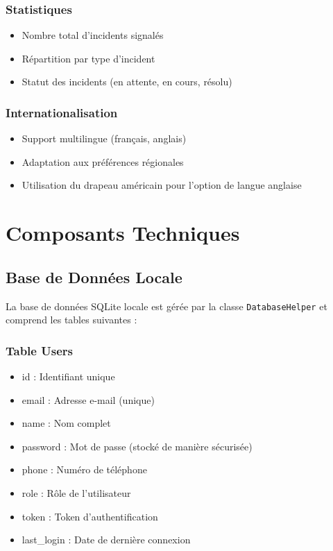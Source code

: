 \documentclass[12pt,a4paper]{article}
\begin{document}
\subsubsection{Statistiques}
\begin{itemize}
    \item Nombre total d'incidents signalés
    \item Répartition par type d'incident
    \item Statut des incidents (en attente, en cours, résolu)
\end{itemize}

\subsubsection{Internationalisation}
\begin{itemize}
    \item Support multilingue (français, anglais)
    \item Adaptation aux préférences régionales
    \item Utilisation du drapeau américain pour l'option de langue anglaise
\end{itemize}

\section{Composants Techniques}

\subsection{Base de Données Locale}

La base de données SQLite locale est gérée par la classe \texttt{DatabaseHelper} et comprend les tables suivantes :

\subsubsection{Table Users}
\begin{itemize}
    \item id : Identifiant unique
    \item email : Adresse e-mail (unique)
    \item name : Nom complet
    \item password : Mot de passe (stocké de manière sécurisée)
    \item phone : Numéro de téléphone
    \item role : Rôle de l'utilisateur
    \item token : Token d'authentification
    \item last\_login : Date de dernière connexion
\end{itemize}
\end{document}
